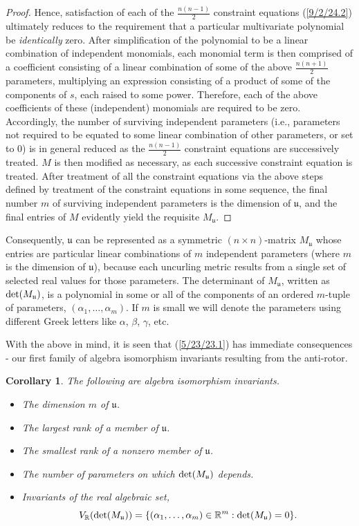 \documentclass{amsart}
\numberwithin{equation}{section}
\newtheorem{corollary}[theorem]{Corollary}
\theoremstyle{definition}
\numberwithin{theorem}{section}
\begin{document}
\begin{proof}
Hence, satisfaction of each of the $\frac{n(n-1)}{2}$ constraint equations (\ref{9/2/24.2}) ultimately reduces to the requirement that a particular multivariate polynomial be {\it identically} zero.  After simplification of the polynomial to be a linear combination of independent monomials, each monomial term is then comprised of a coefficient consisting of a linear combination of some of the above $\frac{n(n+1)}{2}$ parameters, multiplying an expression consisting of a product of some of the components of $s$, each raised to some power.  Therefore, each of the above coefficients of these (independent) monomials are required to be zero.  Accordingly, the number of surviving independent parameters (i.e., parameters not required to be equated to some linear combination of other parameters, or set to 0) is in general reduced as the $\frac{n(n-1)}{2}$ constraint equations are successively treated.  $M$ is then modified as necessary, as each successive constraint equation is treated.  After treatment of all the constraint equations via the above steps defined by treatment of the constraint equations in some sequence, the final number $m$ of surviving independent parameters is the dimension of $\mathfrak{u}$, and the final entries of $M$ evidently yield the requisite $M_\mathfrak{u}$.
\end{proof}

Consequently, $\mathfrak{u}$ can be represented as a symmetric $(n\times n)$-matrix $M_{\mathfrak{u}}$ whose entries are particular linear combinations of $m$ independent parameters (where $m$ is the dimension of $\mathfrak{u}$), because each uncurling metric results from a single set of selected real values for those parameters.  The determinant of $M_{\mathfrak{u}}$, written as ${\rm det}(M_{\mathfrak{u}})$, is a polynomial in some or all of the components of an ordered $m$-tuple of parameters, $(\alpha_1,\dots,\alpha_m)$.  If $m$ is small  we will denote the parameters using different Greek letters like $\alpha$, $\beta$, $\gamma$, etc. 

   With the above in mind, it is seen that (\ref{5/23/23.1}) has immediate consequences - our first family of algebra isomorphism invariants resulting from the anti-rotor. 
           
  \begin{corollary}\label{8/18/23.2} The following are algebra isomorphism invariants. \begin{itemize} \item The dimension $m$ of $\mathfrak{u}$.   \item The largest rank  of a member of $\mathfrak{u}$.  \item The smallest rank of a nonzero member of $\mathfrak{u}$. \item The number of parameters on which ${\rm det}(M_{\mathfrak{u}})$ depends. \item Invariants of the real algebraic set, \[V_\mathbb{R}({\rm det}(M_{\mathfrak{u}})) = \{(\alpha_1,\dots,\alpha_m)\in\mathbb{R}^m: {\rm det}(M_{\mathfrak{u}}) = 0 \}.\] \end{itemize} \end{corollary}
\end{document}
